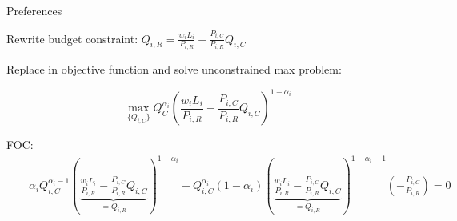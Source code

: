 \documentclass[notes,11pt, aspectratio=169, xcolor=table]{beamer}
\newenvironment{wideitemize}{\itemize\addtolength{\itemsep}{10pt}}{\enditemize}
\begin{document}
\begin{frame}{Preferences}
\begin{wideitemize}
        \item Rewrite budget constraint: $Q_{i,R} = \frac{w_i L_i}{P_{i,R}} - \frac{P_{i,C}}{P_{i,R} } Q_{i,C}$
        \item Replace in objective function and solve unconstrained max problem:

        \begin{equation*}
            \max_{\{Q_{i,C} \}} Q_C^{\alpha_i} \left( \frac{w_i L_i}{P_{i,R}} - \frac{P_{i,C}}{P_{i,R} } Q_{i,C} \right)^{1-\alpha_i}
        \end{equation*}
        \item FOC: 
\scriptsize{
\begin{eqnarray*}
    & & \alpha_i Q_{i,C}^{\alpha_i-1} \left( \underbrace{\frac{w_i L_i}{P_{i,R}} - \frac{P_{i,C}}{P_{i,R} } Q_{i,C}}_{=Q_{i,R}} \right)^{1-\alpha_i} + Q_{i,C}^{\alpha_i} (1-\alpha_i) \left( \underbrace{\frac{w_i L_i}{P_{i,R}} - \frac{P_{i,C}}{P_{i,R} } Q_{i,C}}_{=Q_{i,R}} \right)^{1-\alpha_i-1} \left( - \frac{P_{i,C}}{P_{i,R}}\right) = 0 \\
\end{eqnarray*}
}
\normalsize
\begin{center}
\end{center}

        \end{wideitemize}
\end{frame}
\end{document}
